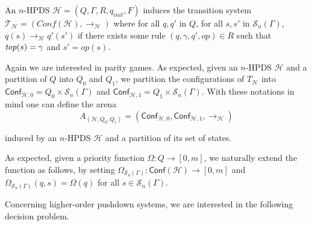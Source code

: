 \documentclass[a4paper,UKenglish,cleveref, autoref, thm-restate]{lipics-v2021}
\newcommand{\problemx}[3]{
	\vspace{0.2cm}
\par\noindent\underline{\sc#1}\par\nobreak\vskip.2\baselineskip
\begingroup\clubpenalty10000\widowpenalty10000
\setbox0\hbox{\bf INPUT:\ }\setbox1\hbox{\bf QUESTION:\ }
\dimen0=\wd0\ifnum\wd1>\dimen0\dimen0=\wd1\fi
\vskip-\parskip\noindent
\hbox to\dimen0{\box0\hfil}\hangindent\dimen0\hangafter1\ignorespaces#2\par
\vskip-\parskip\noindent
\hbox to\dimen0{\box1\hfil}\hangindent\dimen0\hangafter1\ignorespaces#3\par
\endgroup
	\vspace{-0.2cm}
}
\newcommand{\T}{\mathcal{T}}
\renewcommand{\H}{\mathcal{H}}
\newcommand{\Conf}{\mathsf{Conf}}
\newcommand{\win}{\textsc{Win}}
\begin{document}
An $n$-HPDS $\H=(Q, \Gamma, R, q_{init}, F)$
induces the transition system $\T_\H = (Conf(\mathcal{H}), \rightarrow_{\mathcal{H}})$
where
for all $q,q'$ in $Q$,
for all $s,s'$ in $\mathscr{S}_n(\Gamma)$,
$q(s) \rightarrow_{\mathcal{H}} q'(s')$ if
there exists some rule
$(q,\gamma,q',op) \in R$
such that
$\text{\textit{top}}(s) = \gamma$
and
$s' = op(s)$.

Again we are interested in parity games.
As expected, given an 
 $n$-HPDS $\mathcal{H}$
 and a partition of
$Q$ into $Q_0$ and $Q_1$,
we partition the configurations of
$T_{\mathcal{H}}$
into
$\Conf_{\mathcal{H},0}=Q_0\times \mathscr{S}_n(\Gamma)$
and
$\Conf_{\mathcal{H},1}=Q_1\times\mathscr{S}_n(\Gamma)$.
%
%
With these notations in mind one can define the arena
$$
A_{(\mathcal{H}, Q_0, Q_1)}
=
(\Conf_{\mathcal{H},0}, \Conf_{\mathcal{H},1}, \rightarrow_{\mathcal{H}})$$
\par\noindent\ignorespacesafterend
induced by an $n$-HPDS $\mathcal{H}$ and a partition of its set of states.


As expected, given a 
priority function $\Omega: Q \to [0, m]$,
we naturally extend the function
as follows,
by setting
$\Omega_{\mathscr{S}_n(\Gamma)}: \Conf(\mathcal{H}) \to [0, m]$
and
$\Omega_{\mathscr{S}_n(\Gamma)}(q, s) = \Omega(q)$
for all
$s \in \mathscr{S}_n(\Gamma)$.





Concerning higher-order pushdown systems, we are interested in the following decision problem. 

\end{document}
